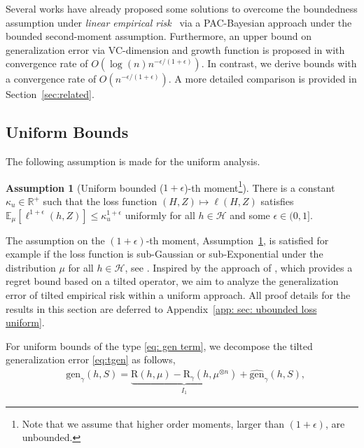 \documentclass{article}
\theoremstyle{plain}
\theoremstyle{plain}
\theoremstyle{definition}
\newtheorem{assumption}[theorem]{Assumption}
\theoremstyle{remark}
\newcommand{\RTrue}{\mathrm{R}}
\newcommand{\RTET}{\mathrm{R}_{\gamma}}
\newcommand{\mbE}{\mathbb{E}}
\newcommand{\todoa}[2][]{\todo[size=tiny,color=blue!20!white,#1]{GA: #2}\xspace}
\newcommand{\todob}[2][]{\todo[size=tiny,color=green!20!white,#1]{AB: #2}\xspace}
\begin{document}
  Several works have already proposed some solutions to overcome the boundedness assumption under \textit{linear empirical risk}~\citep{haddouche2022pac,alquier2018simpler,holland2019pac} via a PAC-Bayesian approach under the bounded second-moment assumption. Furthermore, an upper bound on generalization error via VC-dimension and growth function is proposed in \citet[Corollary 12]{cortes2019relative} with convergence rate of $O(\log(n)n^{-\epsilon/(1+\epsilon)})$. In contrast, we derive bounds with a  convergence rate of $O(n^{-\epsilon/(1+\epsilon)})$. A more detailed comparison is provided in Section~\ref{sec:related}. 
\subsection{Uniform Bounds}\label{sec:uniform_bound}
 The following assumption is made for the uniform analysis.
\begin{assumption}[Uniform bounded ($1+\epsilon$)-th moment\footnote{Note that we assume that higher order moments, larger than $(1+\epsilon)$, are unbounded.}]\label{ass:HV_uniform}
    There is a constant $\kappa_u\in\mathbb{R}^+$ such that the loss function $(H,Z)\mapsto\ell(H,Z)$ satisfies $\mbE_{ \mu}[\ell^{1+\epsilon}(h,Z)]\leq \kappa_u^{1+\epsilon}$ uniformly for all $h \in \mathcal{H}$ and some $\epsilon\in(0,1]$.
\end{assumption}

The assumption on the $(1+\epsilon)$-th moment, Assumption~\ref{ass:HV_uniform}, is satisfied for example if the loss function is sub-Gaussian or sub-Exponential  under the distribution $\mu$ for all $h\in\mathcal{H}$, see \citet{boucheron2013concentration}. Inspired by the approach of \citet{behnamnialog}, which provides a regret bound based on a tilted operator, we aim to analyze the generalization error of tilted empirical risk within a uniform approach.
All proof details for the results in this section are deferred to Appendix~\ref{app: sec: ubounded loss uniform}. 


For uniform bounds of the type \eqref{eq: gen term}, we decompose the tilted generalization error \eqref{eq:tgen} as follows,
\begin{equation}\label{eq: gen decom new}
    \begin{split}
&\mathrm{gen}_{\gamma}(h,S)=   \underbrace{\RTrue(h,\mu)- \RTET(h,\mu^{\otimes n})}_{I_1}+  \widehat{\mathrm{gen}}_{\gamma}(h,S),
    \end{split}
\end{equation}
\end{document}
